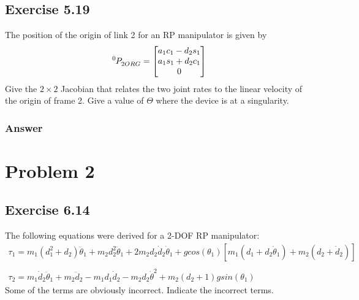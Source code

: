 \documentclass[10pt]{article}
\begin{document}
\subsection*{Exercise 5.19}
The position of the origin of link 2 for an RP manipulator is given by
\[
\tensor*[^{0}]{P}{_{2ORG}} =
\begin{bmatrix}
    a_{1}c_{1} - d_{2}s_{1}     \\
    a_{1}s_{1} + d_{2}c_{1}     \\
    0
\end{bmatrix}
\]
Give the \(2 \times 2\) Jacobian that relates the two joint rates to the linear velocity of the origin of frame {2}. Give a value of \(\Theta\) where the device is at a singularity.
\subsubsection*{Answer}

\pagebreak
\section*{Problem 2}
\subsection*{Exercise 6.14}
The following equations were derived for a 2-DOF RP manipulator:
\[
\begin{array}{l}
    \tau_{1} = m_{1}(d^{2}_{1} + d_{2})\ddot{\theta}_1 + 
				m_{2} d^{2}_{2}\ddot{\theta}_{1} + 
				2m_{2}d_{2}\dot{d}_{2}\dot{\theta}_{1} +
				g cos(\theta_{1})[m_{1}(d_{1} + d_{2}\dot{\theta}_{1}) + m_{2}(d_{2} + \dot{d}_{2})]\\ \\
    \tau_{2} = m_{1}\dot{d}_{2}\ddot{\theta}_{1} + m_{2}\ddot{d}_{2} - m_{1}d_{1}\dot{d}_2 - m_{2}d_{2}\dot{\theta}^2 + m_{2}(d_{2} + 1)g sin(\theta_{1})
\end{array}
\]
Some of the terms are obviously incorrect. Indicate the incorrect terms.
\end{document}
